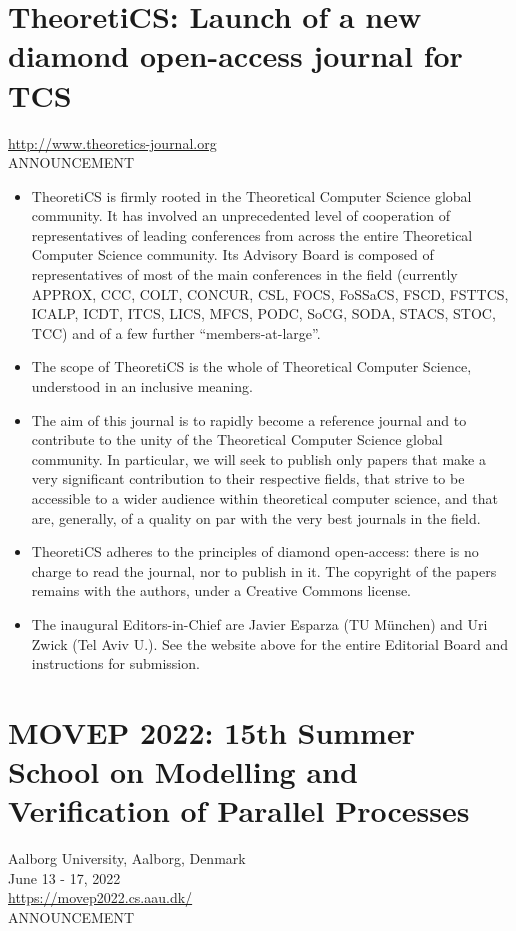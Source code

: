 \documentclass[prodmode,acmtecs]{acmsmall} %
\begin{document}
\section{TheoretiCS: Launch of a new diamond open-access journal for TCS}\label{TheoretiCS}  \href{http://www.theoretics-journal.org}{http://www.theoretics-journal.org}\\ 
ANNOUNCEMENT 

\begin{itemize}\item  TheoretiCS is firmly rooted in the Theoretical Computer Science global community. It has involved an unprecedented level of cooperation of representatives of leading conferences from across the entire Theoretical Computer Science community. Its Advisory Board is composed of representatives of most of the main conferences in the field (currently APPROX, CCC, COLT, CONCUR, CSL, FOCS, FoSSaCS, FSCD, FSTTCS, ICALP, ICDT, ITCS, LICS, MFCS, PODC, SoCG, SODA, STACS, STOC, TCC) and of a few further ``members-at-large''. 
 
\item  The scope of TheoretiCS is the whole of Theoretical Computer Science, understood in an inclusive meaning. 
 
\item  The aim of this journal is to rapidly become a reference journal and to contribute to the unity of the Theoretical Computer Science global community. In particular, we will seek to publish only papers that make a very significant contribution to their respective fields, that strive to be accessible to a wider audience within theoretical computer science, and that are, generally, of a quality on par with the very best journals in the field. 
 
\item  TheoretiCS adheres to the principles of diamond open-access: there is no charge to read the journal, nor to publish in it. The copyright of the papers remains with the authors, under a Creative Commons license. 
 
\item  The inaugural Editors-in-Chief are Javier Esparza (TU München) and Uri Zwick (Tel Aviv U.).   See the website above for the entire Editorial Board and instructions for submission. 
 
\end{itemize}\section{MOVEP 2022: 15th Summer School on Modelling and Verification of Parallel Processes}\label{MOVEP2022}  Aalborg University, Aalborg, Denmark\\ 
  June 13 - 17, 2022\\ 
  \href{https://movep2022.cs.aau.dk/}{https://movep2022.cs.aau.dk/}\\ 
ANNOUNCEMENT 
\end{document}
